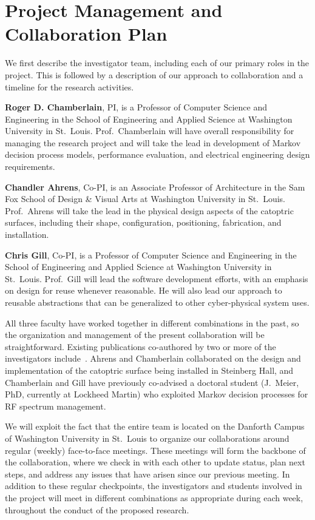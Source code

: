 \section{Project Management and Collaboration Plan}
\label{sec:collab}


We first describe the investigator team, including each of our primary roles
in the project.  This is followed by a description of our approach
to collaboration and a timeline for the research activities.

{\bf Roger D. Chamberlain}, PI, is a Professor of Computer Science
and Engineering in the School of Engineering and Applied Science
at Washington University in St.~Louis.
Prof.~Chamberlain will have overall responsibility for managing the
research project and will take the lead in development of Markov
decision process models, performance evaluation, and electrical engineering
design requirements.

{\bf Chandler Ahrens}, Co-PI, is an Associate Professor of Architecture
in the Sam Fox School of Design \& Visual Arts at Washington University in St.~Louis.
Prof.~Ahrens will take the lead in the physical design aspects of
the catoptric surfaces, including their shape, configuration, positioning,
fabrication, and installation.

{\bf Chris Gill}, Co-PI, is a Professor of Computer Science
and Engineering in the School of Engineering and Applied Science
at Washington University in St.~Louis.
Prof.~Gill will lead the software development efforts, with an emphasis
on design for reuse whenever reasonable.  He will also lead our
approach to reusable abstractions that can be generalized to other
cyber-physical system uses.

All three faculty have worked together in different combinations in the 
past, so the organization and management of the present collaboration 
will be straightforward.  Existing publications co-authored by two or 
more of the investigators include~\cite{acmb18,cag18,cagm18,mgc16, mskgct13}.
Ahrens 
and Chamberlain collaborated on the design and implementation of the 
catoptric surface being installed in Steinberg Hall, and Chamberlain 
and Gill have previously co-advised a doctoral student (J.~Meier, 
PhD, currently at Lockheed Martin) who exploited Markov decision 
processes for RF spectrum management.

We will exploit the fact that the entire team is located on the
Danforth Campus of Washington University in St.~Louis to organize
our collaborations around regular (weekly) face-to-face meetings.  
These meetings will form the backbone of the collaboration, where 
we check in with each other to update status, plan next steps, and 
address any issues that have arisen since our previous meeting.
In addition to these regular checkpoints, the investigators and
students involved in the project will meet in different combinations
as appropriate during each week, throughout the conduct of the 
proposed research.

